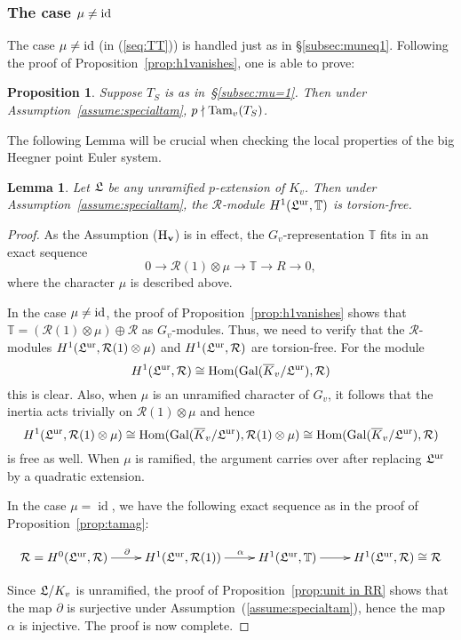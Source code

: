 \documentclass[12pt]{amsart}
\numberwithin{equation}{section}
\newtheorem{lemma}[thm]{Lemma}
\newtheorem{prop}[thm]{Proposition}
\begin{document}
 \subsubsection{The case $\mu\neq\textup{id}$}
 The case $\mu\neq\textup{id}$ (in (\ref{seq:TT})) is handled just as in \S\ref{subsec:muneq1}. Following the proof of Proposition~\ref{prop:h1vanishes}, one is able to prove:
 \begin{prop}
 \label{prop:tamtrivmuneq1}
 Suppose $T_S$ is as in~\S\ref{subsec:mu=1}. Then under Assumption~\ref{assume:specialtam}, $p \nmid \textup{Tam}_v(T_S)$.
 \end{prop}
 The following Lemma will be crucial when checking the local properties of the big Heegner point Euler system.
\begin{lemma}
\label{lemma:torsionfree}
Let $\frak{L}$ be any unramified $p$-extension of $K_v$. Then under Assumption~\ref{assume:specialtam}, the ${\mathcal{R}}$-module $H^1(\frak{L}^{\textup{ur}},{\mathbb{T}})$ is torsion-free.
\end{lemma}
\begin{proof}
As the Assumption ($\mathbf{\textup{H}_v}$) is in effect, the $G_v$-representation ${\mathbb{T}}$ fits in an exact sequence
$$0 {\longrightarrow} {\mathcal{R}}(1)\otimes\mu {\longrightarrow} {\mathbb{T}} {\longrightarrow} R {\longrightarrow} 0,$$
where the character $\mu$ is described above.

In the case $\mu\neq \textup{id}$, the proof of Proposition~\ref{prop:h1vanishes} shows that ${\mathbb{T}}=({\mathcal{R}}(1)\otimes\mu) \oplus {\mathcal{R}}$ as $G_v$-modules. Thus, we need to verify that the ${\mathcal{R}}$-modules $H^1(\frak{L}^{\textup{ur}}, {\mathcal{R}}(1)\otimes\mu)$ and $H^1(\frak{L}^{\textup{ur}}, {\mathcal{R}})$ are torsion-free. For the module $$H^1(\frak{L}^{\textup{ur}}, {\mathcal{R}})\cong \textup{Hom}(\textup{Gal}(\overline{K}_v/\frak{L}^{\textup{ur}}),{\mathcal{R}})$$
this is clear. Also, when $\mu$ is an unramified character of $G_v$, it follows that the inertia acts trivially on  ${\mathcal{R}}(1)\otimes\mu$ and hence $$H^1(\frak{L}^{\textup{ur}},{\mathcal{R}}(1)\otimes\mu)\cong  \textup{Hom}(\textup{Gal}(\overline{K}_v/\frak{L}^{\textup{ur}}),{\mathcal{R}}(1)\otimes\mu)\cong \textup{Hom}(\textup{Gal}(\overline{K}_v/\frak{L}^{\textup{ur}}),{\mathcal{R}})$$ is free as well. When $\mu$ is ramified, the argument carries over after replacing $\frak{L}^{\textup{ur}}$ by a quadratic extension.

In the case $\mu=\operatorname{id}$, we have the following exact sequence as in the proof of Proposition~\ref{prop:tamag}:

$$\xymatrix{
 {\mathcal{R}}=H^0(\frak{L}^{\textup{ur}},{\mathcal{R}}) \ar[r]^(.53){\partial} & H^1(\frak{L}^{\textup{ur}},{\mathcal{R}}(1)) \ar[r]^(.55){\alpha} &H^1(\frak{L}^{\textup{ur}},{\mathbb{T}}) \ar[r]& H^1(\frak{L}^{\textup{ur}}, {\mathcal{R}})\cong{\mathcal{R}}
}
$$
 
Since $\frak{L}/K_v$ is unramified, the proof of Proposition~\ref{prop:unit in RR} shows that the map $\partial$ is surjective under Assumption~(\ref{assume:specialtam}), hence the map $\alpha$ is injective. The proof is now complete.
\end{proof}
\end{document}
